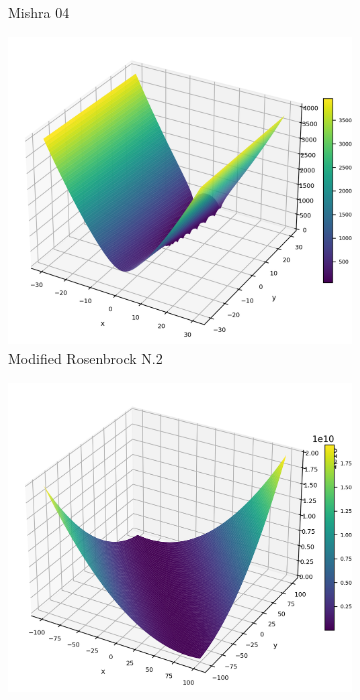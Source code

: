 \begin{figure}[p]
\begin{subfigure}{0.48\textwidth}
        \caption{Mishra 04}
    \end{subfigure}
    \begin{subfigure}{0.48\textwidth}
        \centering
        \includegraphics[width=1\textwidth]{Figures/benchmark_plots/Modified_Rosenbrock_No.02___Hollow_Ground_Bent_Knife_Edge_maximized.png}
        \caption{Modified Rosenbrock N.2}
    \end{subfigure}
    \begin{subfigure}{0.32\textwidth}
        \centering
        \includegraphics[width=1\textwidth]{Figures/benchmark_plots/Rotated_Bent_Cigar_maximized.png}

\end{subfigure}
\end{figure}
